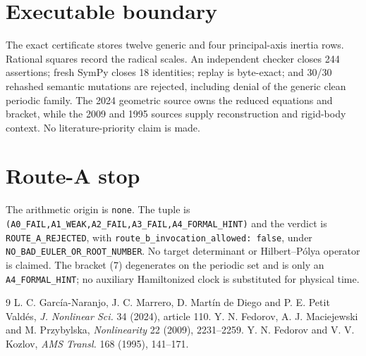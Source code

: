 \documentclass[10pt]{article}
\begin{document}
\section{Executable boundary}
The exact certificate stores twelve generic and four principal-axis inertia
rows.  Rational squares record the radical scales.  An independent checker
closes 244 assertions; fresh SymPy closes 18 identities; replay is byte-exact;
and 30/30 rehashed semantic mutations are rejected, including denial of the
generic clean periodic family.  The 2024 geometric source owns the reduced
equations and bracket, while the 2009 and 1995 sources supply reconstruction
and rigid-body context.  No literature-priority claim is made.
\section{Route-A stop}
The arithmetic origin is \texttt{none}.  The tuple is
\texttt{(A0\_FAIL,A1\_WEAK,A2\_FAIL,A3\_FAIL,A4\_FORMAL\_HINT)} and the
verdict is \texttt{ROUTE\_A\_REJECTED}, with
\texttt{route\_b\_invocation\_allowed: false}, under
\texttt{NO\_BAD\_EULER\_OR\_ROOT\_NUMBER}.  No target determinant or
Hilbert--P\'olya operator is claimed.  The bracket (7) degenerates on the
periodic set and is only an \texttt{A4\_FORMAL\_HINT}; no auxiliary
Hamiltonized clock is substituted for physical time.
\begin{thebibliography}{9}
 L. C. Garc\'ia-Naranjo, J. C. Marrero, D. Mart\'in de Diego and
P. E. Petit Vald\'es, \emph{J. Nonlinear Sci.} 34 (2024), article 110.
 Y. N. Fedorov, A. J. Maciejewski and M. Przybylska,
\emph{Nonlinearity} 22 (2009), 2231--2259.
 Y. N. Fedorov and V. V. Kozlov, \emph{AMS Transl.} 168 (1995),
141--171.
\end{thebibliography}
\end{document}

